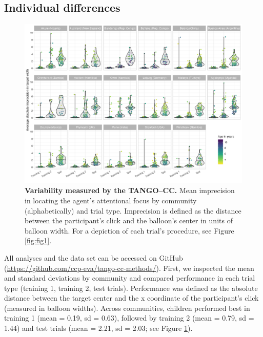 \documentclass[
  man,floatsintext]{apa7}
\begin{document}
\subsection{Individual differences}\label{individual-differences}



\begin{figure}

{\centering \includegraphics[width=1\linewidth]{../figures/tango-cc-variability} 

}

\caption{\textbf{Variability measured by the TANGO--CC.} Mean imprecision in locating the agent's attentional focus by community (alphabetically) and trial type. Imprecision is defined as the distance between the participant's click and the balloon's center in units of balloon width. For a depiction of each trial's procedure, see Figure \ref{fig:fig1}.}\label{fig:fig3}
\end{figure}

All analyses and the data set can be accessed on GitHub (\url{https://github.com/ccp-eva/tango-cc-methods/}).
First, we inspected the mean and standard deviations by community and compared performance in each trial type (training 1, training 2, test trials).
Performance was defined as the absolute distance between the target center and the x coordinate of the participant's click (measured in balloon widths).
Across communities, children performed best in training 1 (mean = 0.19, sd = 0.63), followed by training 2 (mean = 0.79, sd = 1.44) and test trials (mean = 2.21, sd = 2.03; see Figure \ref{fig:fig3}).
\end{document}
